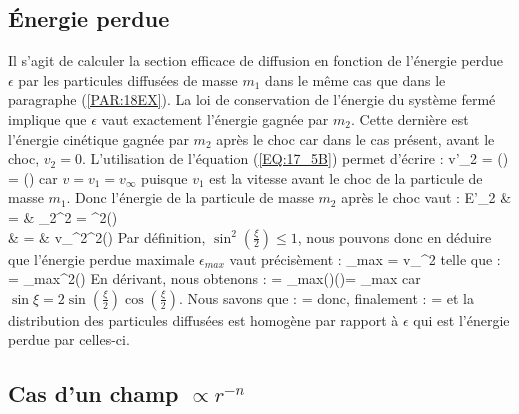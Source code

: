 \subsection{\'Energie perdue}

Il s'agit de calculer la section efficace de diffusion en fonction de l'\'energie perdue $\epsilon$ par les particules diffus\'ees de masse $m_{1}$ dans le m\^eme cas que dans le paragraphe (\ref{PAR:18EX}). La loi de conservation de l'\'energie du syst\`eme ferm\'e implique que $\epsilon$ vaut exactement l'\'energie gagn\'ee par $m_{2}$. Cette derni\`ere est l'\'energie cin\'etique gagn\'ee par $m_{2}$ apr\`es le choc car dans le cas pr\'esent, avant le choc, $v_{2} = 0$. L'utilisation de l'\'equation (\ref{EQ:17_5B}) permet d'\'ecrire :
\benn
	v'_{2} = \sin\left(\right) = \sin\left(\right)
\eenn
car $v = v_{1} = v_{\infty}$ puisque $v_{1}$ est la vitesse avant le choc de la particule de masse $m_{1}$. Donc l'\'energie de la particule de masse $m_{2}$ apr\`es le choc vaut :
\bea
	E'_{2} & = & _{2}^{2} = \sin^{2}\left(\right) \nonumber \\
	\Leftrightarrow \epsilon & = & v_{\infty}^{2}\sin^{2}\left(\right) \nonumber
\eea
Par d\'efinition, $\sin^{2}(\frac{\xi}{2}) \leq 1$, nous pouvons donc en d\'eduire que l'\'energie perdue maximale $\epsilon_{max}$ vaut pr\'ecis\`ement :
\benn
	\epsilon_{max} = v_{\infty}^{2}
\eenn
telle que :
\benn
	\epsilon = \epsilon_{max}\sin^{2}\left(\right)
\eenn
En d\'erivant, nous obtenons :
\benn
	\epsilon = \epsilon_{max}\sin\left(\right)\cos\left(\right)\xi = \epsilon_{max}\sin\xi{}\xi
\eenn
car $\sin\xi = 2\sin(\frac{\xi}{2})\cos(\frac{\xi}{2})$. Nous savons que :
\benn
	\sigma = \sin\xi{}\xi
\eenn
donc, finalement :
\benn
	\sigma = \epsilon
\eenn
et la distribution des particules diffus\'ees est homog\`ene par rapport \`a $\epsilon$ qui est l'\'energie perdue par celles-ci.

\subsection{Cas d'un champ $\propto r^{-n}$}

